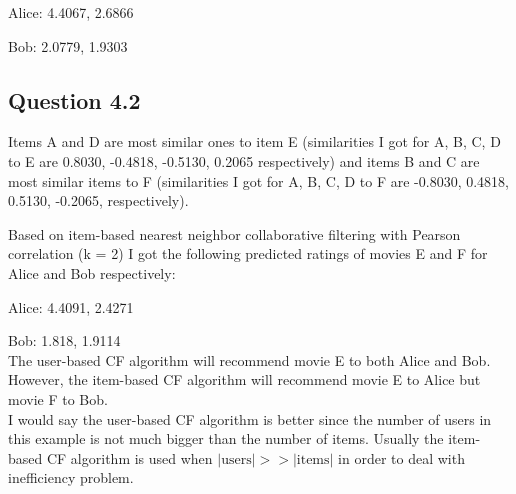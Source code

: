\documentclass[11pt]{article}
\begin{document}
Alice: 4.4067, 2.6866

Bob: 2.0779, 1.9303


\subsection*{Question 4.2}%

Items A and D are most similar ones to item E (similarities I got for A, B, C, D to E are 0.8030, -0.4818, -0.5130, 0.2065 respectively) and items B and C are most similar items to F (similarities I got for A, B, C, D to F are -0.8030, 0.4818, 0.5130, -0.2065, respectively). 

Based on item-based nearest neighbor collaborative filtering with Pearson correlation (k = 2) I got the following predicted ratings of movies E and F for Alice and Bob respectively:

Alice: 4.4091, 2.4271

Bob: 1.818, 1.9114  \\


The user-based CF algorithm will recommend movie E to both Alice and Bob. However, the item-based CF algorithm will recommend movie E to Alice but movie F to Bob.  \\



I would say the user-based CF algorithm is better since the number of users in this example is not much bigger than the number of items. Usually the item-based CF algorithm is used when $|\text{users}| >\!\!> |\text{items}|$ in order to deal with inefficiency problem. 
\end{document}
